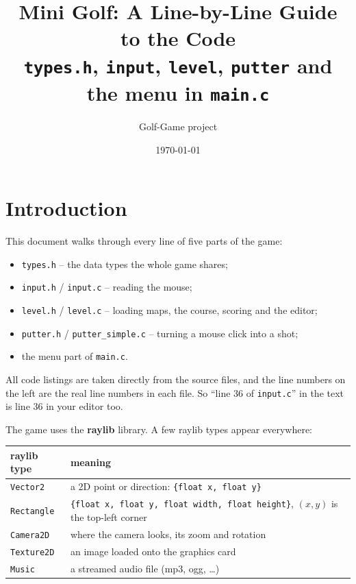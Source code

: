 \documentclass[11pt,a4paper]{article}
\title{Mini Golf: A Line-by-Line Guide to the Code\\[4pt]
\large \texttt{types.h}, \texttt{input}, \texttt{level}, \texttt{putter} and the menu in \texttt{main.c}}
\author{Golf-Game project}
\date{\today}
\begin{document}
\maketitle
\tableofcontents
\newpage

\section{Introduction}

This document walks through every line of five parts of the game:

\begin{itemize}
  \item \texttt{types.h} -- the data types the whole game shares;
  \item \texttt{input.h} / \texttt{input.c} -- reading the mouse;
  \item \texttt{level.h} / \texttt{level.c} -- loading maps, the course, scoring and the editor;
  \item \texttt{putter.h} / \texttt{putter\_simple.c} -- turning a mouse click into a shot;
  \item the menu part of \texttt{main.c}.
\end{itemize}

All code listings are taken directly from the source files, and the line numbers on the left are the
real line numbers in each file. So ``line 36 of \texttt{input.c}'' in the text is line 36 in your editor too.

The game uses the \textbf{raylib} library. A few raylib types appear everywhere:

\begin{center}
\begin{tabular}{@{}ll@{}}
\toprule
raylib type & meaning \\
\midrule
\texttt{Vector2}   & a 2D point or direction: \texttt{\{float x, float y\}} \\
\texttt{Rectangle} & \texttt{\{float x, float y, float width, float height\}}, $(x,y)$ is the top-left corner \\
\texttt{Camera2D}  & where the camera looks, its zoom and rotation \\
\texttt{Texture2D} & an image loaded onto the graphics card \\
\texttt{Music}     & a streamed audio file (mp3, ogg, \dots) \\
\bottomrule
\end{tabular}
\end{center}
\end{document}
